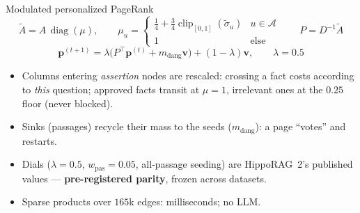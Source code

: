 \documentclass[aspectratio=169,10pt]{beamer}
\newcommand{\hippo}{HippoRAG~2}
\begin{document}
\begin{frame}{Modulated personalized PageRank}
\[
\tilde A = A\,\operatorname{diag}(\mu),\qquad
\mu_u=\begin{cases}\tfrac14+\tfrac34\operatorname{clip}_{[0,1]}(\tilde\sigma_u)& u\in\mathcal A\\ 1&\text{else}\end{cases}
\qquad P=D^{-1}\tilde A
\]
\[
\mathbf p^{(t+1)}=\lambda\bigl(P^{\!\top}\mathbf p^{(t)}+m_{\text{dang}}\mathbf v\bigr)+(1-\lambda)\mathbf v,
\qquad \lambda=0.5
\]
\begin{itemize}\footnotesize
\item Columns entering \emph{assertion} nodes are rescaled: crossing a fact
  costs according to \emph{this} question; approved facts transit at
  $\mu=1$, irrelevant ones at the $0.25$ floor (never blocked).
\item Sinks (passages) recycle their mass to the seeds ($m_{\text{dang}}$):
  a page ``votes'' and restarts.
\item Dials ($\lambda{=}0.5$, $w_{\text{pas}}{=}0.05$, all-passage seeding)
  are \hippo{}'s published values --- \textbf{pre-registered parity}, frozen
  across datasets.
\item Sparse products over $165$k edges: milliseconds; no LLM.
\end{itemize}
\end{frame}
\end{document}
